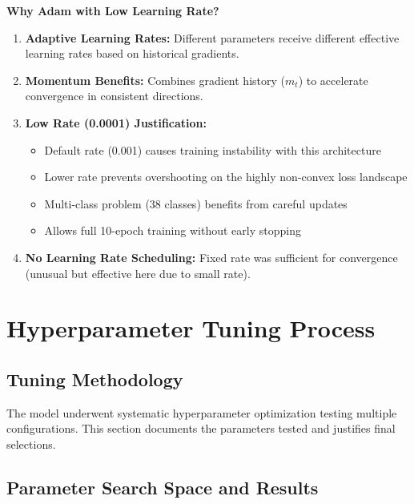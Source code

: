 \documentclass[11pt,a4paper]{article}
\begin{document}
\textbf{Why Adam with Low Learning Rate?}

\begin{enumerate}
    \item \textbf{Adaptive Learning Rates:} Different parameters receive different effective learning rates based on historical gradients.
    \item \textbf{Momentum Benefits:} Combines gradient history ($m_t$) to accelerate convergence in consistent directions.
    \item \textbf{Low Rate (0.0001) Justification:} 
    \begin{itemize}
        \item Default rate (0.001) causes training instability with this architecture
        \item Lower rate prevents overshooting on the highly non-convex loss landscape
        \item Multi-class problem (38 classes) benefits from careful updates
        \item Allows full 10-epoch training without early stopping
    \end{itemize}
    \item \textbf{No Learning Rate Scheduling:} Fixed rate was sufficient for convergence (unusual but effective here due to small rate).
\end{enumerate}

\newpage

\section{Hyperparameter Tuning Process}

\subsection{Tuning Methodology}

The model underwent systematic hyperparameter optimization testing multiple configurations. This section documents the parameters tested and justifies final selections.

\subsection{Parameter Search Space and Results}
\end{document}
